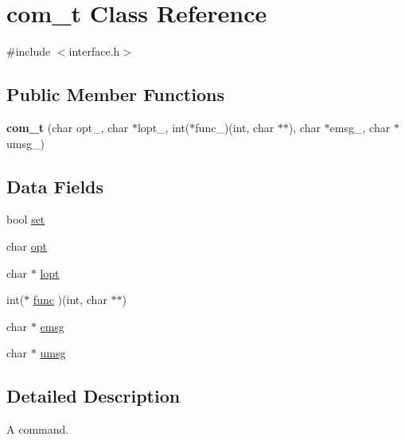 \hypertarget{classcom__t}{\section{com\-\_\-t Class Reference}
\label{classcom__t}
}


{\ttfamily \#include $<$interface.\-h$>$}

\subsection*{Public Member Functions}
\begin{DoxyCompactItemize}
\item 
\hypertarget{classcom__t_ab94dc9902c7ffb72768825bb9dc5afda}{{\bfseries com\-\_\-t} (char opt\-\_\-, char $\ast$lopt\-\_\-, int($\ast$func\-\_\-)(int, char $\ast$$\ast$), char $\ast$emsg\-\_\-, char $\ast$umsg\-\_\-)}\label{classcom__t_ab94dc9902c7ffb72768825bb9dc5afda}

\end{DoxyCompactItemize}
\subsection*{Data Fields}
\begin{DoxyCompactItemize}
\item 
bool \hyperlink{classcom__t_ae8b6c03d7ec9397c7570295b9f0162fc}{set}
\item 
char \hyperlink{classcom__t_a221c5d1fb0f1d23299526c0efb7c131d}{opt}
\item 
char $\ast$ \hyperlink{classcom__t_a9fc395b3e6669f5370ff4c4281202a9e}{lopt}
\item 
int($\ast$ \hyperlink{classcom__t_a04457e8446cd906b5bed24c43077979d}{func} )(int, char $\ast$$\ast$)
\item 
char $\ast$ \hyperlink{classcom__t_a335660c29bfa0cf5e324a3d54704f351}{emsg}
\item 
char $\ast$ \hyperlink{classcom__t_a2c4d760c9849ab6c4fd24258ee9bd194}{umsg}
\end{DoxyCompactItemize}


\subsection{Detailed Description}
A command. 

